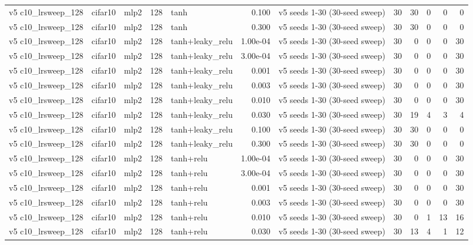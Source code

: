 \begin{table}[htbp]
{\begin{tabular}{@{}lllrlrlrrrrr@{}}
v5 c10\_lrsweep\_128 & cifar10 & mlp2 & 128 & tanh & 0.100 & v5 seeds 1-30 (30-seed sweep) & 30 & 30 & 0 & 0 & 0 \\
v5 c10\_lrsweep\_128 & cifar10 & mlp2 & 128 & tanh & 0.300 & v5 seeds 1-30 (30-seed sweep) & 30 & 30 & 0 & 0 & 0 \\
v5 c10\_lrsweep\_128 & cifar10 & mlp2 & 128 & tanh+leaky\_relu & 1.00e-04 & v5 seeds 1-30 (30-seed sweep) & 30 & 0 & 0 & 0 & 30 \\
v5 c10\_lrsweep\_128 & cifar10 & mlp2 & 128 & tanh+leaky\_relu & 3.00e-04 & v5 seeds 1-30 (30-seed sweep) & 30 & 0 & 0 & 0 & 30 \\
v5 c10\_lrsweep\_128 & cifar10 & mlp2 & 128 & tanh+leaky\_relu & 0.001 & v5 seeds 1-30 (30-seed sweep) & 30 & 0 & 0 & 0 & 30 \\
v5 c10\_lrsweep\_128 & cifar10 & mlp2 & 128 & tanh+leaky\_relu & 0.003 & v5 seeds 1-30 (30-seed sweep) & 30 & 0 & 0 & 0 & 30 \\
v5 c10\_lrsweep\_128 & cifar10 & mlp2 & 128 & tanh+leaky\_relu & 0.010 & v5 seeds 1-30 (30-seed sweep) & 30 & 0 & 0 & 0 & 30 \\
v5 c10\_lrsweep\_128 & cifar10 & mlp2 & 128 & tanh+leaky\_relu & 0.030 & v5 seeds 1-30 (30-seed sweep) & 30 & 19 & 4 & 3 & 4 \\
v5 c10\_lrsweep\_128 & cifar10 & mlp2 & 128 & tanh+leaky\_relu & 0.100 & v5 seeds 1-30 (30-seed sweep) & 30 & 30 & 0 & 0 & 0 \\
v5 c10\_lrsweep\_128 & cifar10 & mlp2 & 128 & tanh+leaky\_relu & 0.300 & v5 seeds 1-30 (30-seed sweep) & 30 & 30 & 0 & 0 & 0 \\
v5 c10\_lrsweep\_128 & cifar10 & mlp2 & 128 & tanh+relu & 1.00e-04 & v5 seeds 1-30 (30-seed sweep) & 30 & 0 & 0 & 0 & 30 \\
v5 c10\_lrsweep\_128 & cifar10 & mlp2 & 128 & tanh+relu & 3.00e-04 & v5 seeds 1-30 (30-seed sweep) & 30 & 0 & 0 & 0 & 30 \\
v5 c10\_lrsweep\_128 & cifar10 & mlp2 & 128 & tanh+relu & 0.001 & v5 seeds 1-30 (30-seed sweep) & 30 & 0 & 0 & 0 & 30 \\
v5 c10\_lrsweep\_128 & cifar10 & mlp2 & 128 & tanh+relu & 0.003 & v5 seeds 1-30 (30-seed sweep) & 30 & 0 & 0 & 0 & 30 \\
v5 c10\_lrsweep\_128 & cifar10 & mlp2 & 128 & tanh+relu & 0.010 & v5 seeds 1-30 (30-seed sweep) & 30 & 0 & 1 & 13 & 16 \\
v5 c10\_lrsweep\_128 & cifar10 & mlp2 & 128 & tanh+relu & 0.030 & v5 seeds 1-30 (30-seed sweep) & 30 & 13 & 4 & 1 & 12 \\

\end{tabular}}
\end{table}
